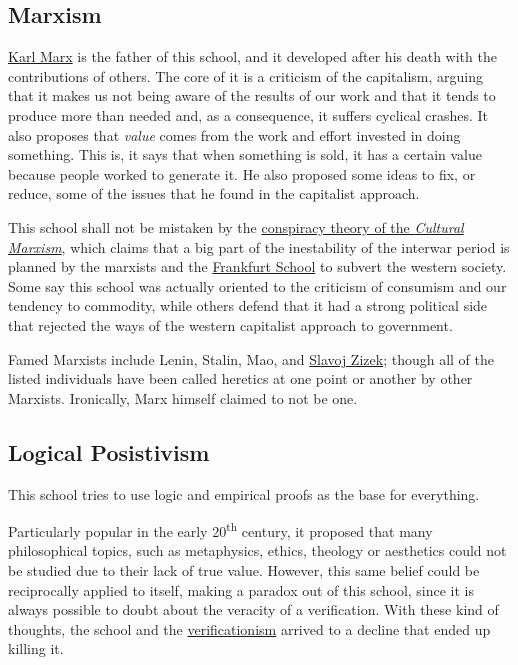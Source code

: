 \documentclass[../my_knowledge.tex]{subfiles}
\begin{document}
\subsection{Marxism}
\href{https://www.youtube.com/watch?v=fSQgCy_iIcc}{Karl Marx} is the father of this school, and it developed after his death with the contributions of others. The core of it is a criticism of the capitalism, arguing that it makes us not being aware of the results of our work and that it tends to produce more than needed and, as a consequence, it suffers cyclical crashes. It also proposes that \textit{value} comes from the work and effort invested in doing something. This is, it says that when something is sold, it has a certain value because people worked to generate it. He also proposed some ideas to fix, or reduce, some of the issues that he found in the capitalist approach.

This school shall not be mistaken by the \href{https://en.wikipedia.org/wiki/Cultural_Marxism_conspiracy_theory}{conspiracy theory of the \textit{Cultural Marxism}}, which claims that a big part of the inestability of the interwar period is planned by the marxists and the \href{https://en.wikipedia.org/wiki/Frankfurt_School}{Frankfurt School} to subvert the western society. Some say this school was actually oriented to the criticism of consumism and our tendency to commodity, while others defend that it had a strong political side that rejected the ways of the western capitalist approach to government.

Famed Marxists include Lenin, Stalin, Mao, and \href{https://bigthink.com/experts/slavoj-zizek}{Slavoj Zizek}; though all of the listed individuals have been called heretics at one point or another by other Marxists. Ironically, Marx himself claimed to not be one.

\subsection{Logical Posistivism}
This school tries to use logic and empirical proofs as the base for everything.

Particularly popular in the early 20\textsuperscript{th} century, it proposed that many philosophical topics, such as metaphysics, ethics, theology or aesthetics could not be studied due to their lack of true value. However, this same belief could be reciprocally applied to itself, making a paradox out of this school, since it is always possible to doubt about the veracity of a verification. With these kind of thoughts, the school and the \href{https://en.wikipedia.org/wiki/Verificationism}{verificationism} arrived to a decline that ended up killing it.
\end{document}
